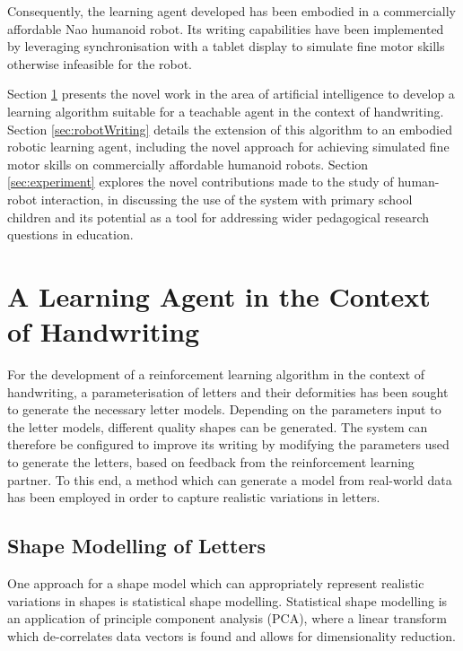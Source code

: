\documentclass{sig-alternate}
\begin{document}
Consequently, the learning agent developed has been embodied in a commercially
affordable Nao humanoid robot. Its writing capabilities have been implemented by
leveraging synchronisation with a tablet display to simulate fine motor skills
otherwise infeasible for the robot. 
%
%

Section \ref{sec:learningAlgorithm} presents the novel work in the area of
artificial intelligence to develop a learning algorithm suitable for a teachable
agent in the context of handwriting.  Section \ref{sec:robotWriting} details the
extension of this algorithm to an embodied robotic learning agent, including the
novel approach for achieving simulated fine motor skills on commercially
affordable humanoid robots.  Section \ref{sec:experiment} explores the novel%
%
%
contributions made to the study of human-robot interaction, in discussing the
use of the system with primary school children and its potential as a tool for
addressing wider pedagogical research questions in education. 



\section{A Learning Agent in the Context of Handwriting} \label{sec:learningAlgorithm}

For the development of a reinforcement learning algorithm in the context of
handwriting, a parameterisation of letters and their deformities has been sought
to generate the necessary letter models. Depending on the parameters input to
the letter models, different quality shapes can be generated. The system can
therefore be configured to improve its writing by modifying the parameters used
to generate the letters, based on feedback from the reinforcement learning
partner. To this end, a method which can generate a model from real-world data
has been employed in order to capture realistic variations in letters. 

\subsection{Shape Modelling of Letters} \label{sec:writingGeneration}

One approach for a shape model which can appropriately represent realistic
variations in shapes is statistical shape
modelling. Statistical shape modelling is an application of principle component
analysis (PCA), where a linear transform which de-correlates data vectors is
found \cite{Stegmann2002} and allows for dimensionality reduction. 
\end{document}
